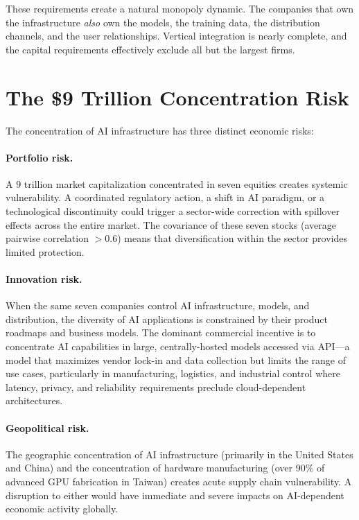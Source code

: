 \documentclass[11pt,a4paper,openright]{book}
\begin{document}
These requirements create a natural monopoly dynamic. The companies that own the infrastructure \emph{also} own the models, the training data, the distribution channels, and the user relationships. Vertical integration is nearly complete, and the capital requirements effectively exclude all but the largest firms.

\section{The \$9 Trillion Concentration Risk}

The concentration of AI infrastructure has three distinct economic risks:

\paragraph{Portfolio risk.}
A $9$ trillion market capitalization concentrated in seven equities creates systemic vulnerability. A coordinated regulatory action, a shift in AI paradigm, or a technological discontinuity could trigger a sector-wide correction with spillover effects across the entire market. The covariance of these seven stocks (average pairwise correlation $>0.6$) means that diversification within the sector provides limited protection.

\paragraph{Innovation risk.}
When the same seven companies control AI infrastructure, models, and distribution, the diversity of AI applications is constrained by their product roadmaps and business models. The dominant commercial incentive is to concentrate AI capabilities in large, centrally-hosted models accessed via API---a model that maximizes vendor lock-in and data collection but limits the range of use cases, particularly in manufacturing, logistics, and industrial control where latency, privacy, and reliability requirements preclude cloud-dependent architectures.

\paragraph{Geopolitical risk.}
The geographic concentration of AI infrastructure (primarily in the United States and China) and the concentration of hardware manufacturing (over 90\% of advanced GPU fabrication in Taiwan) creates acute supply chain vulnerability. A disruption to either would have immediate and severe impacts on AI-dependent economic activity globally.
\end{document}
